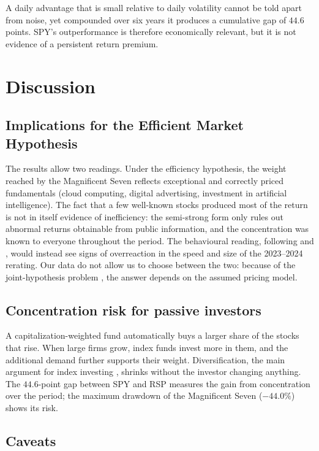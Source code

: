 \documentclass[12pt, a4paper]{article}
\begin{document}
A daily advantage that is small relative to daily volatility cannot be told apart from noise, yet compounded over six years it produces a cumulative gap of $44.6$ points. SPY's outperformance is therefore economically relevant, but it is not evidence of a persistent return premium.

\section{Discussion}

\subsection{Implications for the Efficient Market Hypothesis}

The results allow two readings. Under the efficiency hypothesis, the weight reached by the Magnificent Seven reflects exceptional and correctly priced fundamentals (cloud computing, digital advertising, investment in artificial intelligence). The fact that a few well-known stocks produced most of the return is not in itself evidence of inefficiency: the semi-strong form only rules out abnormal returns obtainable from public information, and the concentration was known to everyone throughout the period. The behavioural reading, following \citet{shiller1981} and \citet{debondt1985}, would instead see signs of overreaction in the speed and size of the 2023--2024 rerating. Our data do not allow us to choose between the two: because of the joint-hypothesis problem \citep{fama1991}, the answer depends on the assumed pricing model.

\subsection{Concentration risk for passive investors}

A capitalization-weighted fund automatically buys a larger share of the stocks that rise. When large firms grow, index funds invest more in them, and the additional demand further supports their weight. Diversification, the main argument for index investing \citep{markowitz1952}, shrinks without the investor changing anything. The $44.6$-point gap between SPY and RSP measures the gain from concentration over the period; the maximum drawdown of the Magnificent Seven ($-44.0\%$) shows its risk.

\subsection{Caveats}
\end{document}
